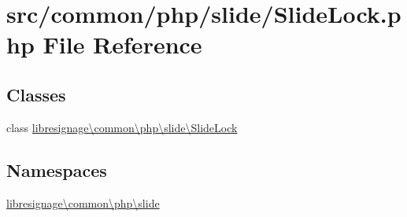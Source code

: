 \hypertarget{SlideLock_8php}{}\section{src/common/php/slide/\+Slide\+Lock.php File Reference}
\label{SlideLock_8php}
\subsection*{Classes}
\begin{DoxyCompactItemize}
\item 
class \hyperlink{classlibresignage_1_1common_1_1php_1_1slide_1_1SlideLock}{libresignage\textbackslash{}common\textbackslash{}php\textbackslash{}slide\textbackslash{}\+Slide\+Lock}
\end{DoxyCompactItemize}
\subsection*{Namespaces}
\begin{DoxyCompactItemize}
\item 
 \hyperlink{namespacelibresignage_1_1common_1_1php_1_1slide}{libresignage\textbackslash{}common\textbackslash{}php\textbackslash{}slide}
\end{DoxyCompactItemize}
